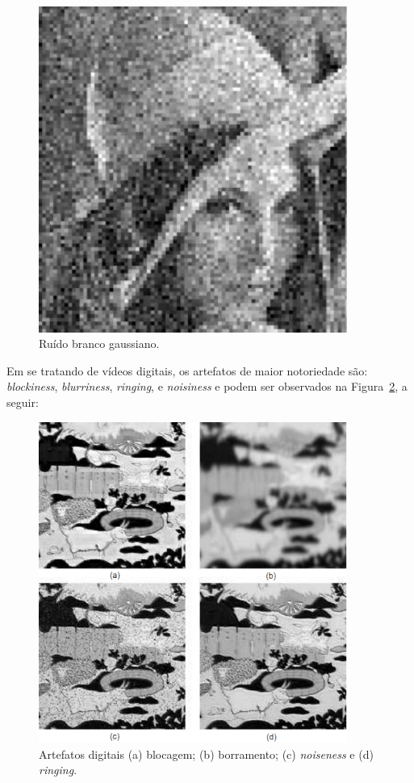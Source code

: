 \begin{figure}[!htb]
	\centering
	\includegraphics[width=0.9\textwidth]{./imgs/artefatosanalogicos.png}
	\caption{Ruído branco gaussiano.}
	\label{fig:artefatosanalogicos}
\end{figure}

Em se tratando de vídeos digitais, os artefatos de maior notoriedade são: \emph{blockiness}, \emph{blurriness}, \emph{ringing}, e \emph{noisiness} \cite{farias2007} e podem ser observados na Figura~\ref{fig:artefatosdigitais}, a seguir:

\begin{figure}[!htb]
	\centering
	\includegraphics[width=0.9\textwidth]{./imgs/artefatosdigitais.png}
	\caption[Artefatos digitais]{Artefatos digitais (a) blocagem; (b) borramento; (c) \emph{noiseness} e (d) \emph{ringing}.}
	\label{fig:artefatosdigitais}
\end{figure}

